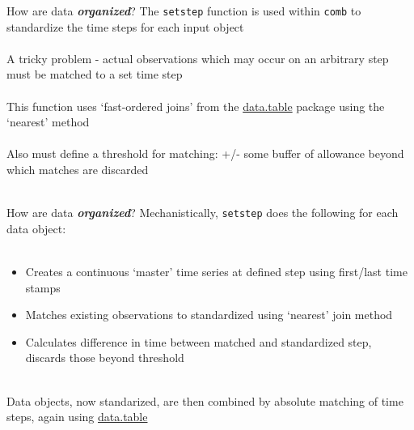 \documentclass[serif]{beamer}\usepackage[]{graphicx}\usepackage[]{color}
\newcommand{\Bigtxt}[1]{\textbf{\textit{#1}}}
\begin{document}
\begin{frame}{How are data \Bigtxt{organized}?}
The \texttt{setstep} function is used within \texttt{comb} to standardize the time steps for each input object \\~\\
A tricky problem - actual observations which may occur on an arbitrary step must be matched to a set time step\\~\\
This function uses `fast-ordered joins' from the \href{http://cran.r-project.org/web/packages/data.table/index.html}{data.table} package using the `nearest' method\\~\\
Also must define a threshold for matching: +/- some buffer of allowance beyond which matches are discarded \\~\\
\end{frame}

\begin{frame}{How are data \Bigtxt{organized}?}
Mechanistically, \texttt{setstep} does the following for each data object: \\~\\
\begin{itemize}
\item Creates a continuous `master' time series at defined step using first/last time stamps
\item Matches existing observations to standardized using `nearest' join method
\item Calculates difference in time between matched and standardized step, discards those beyond threshold \\~\\
\end{itemize}
Data objects, now standarized, are then combined by absolute matching of time steps, again using \href{http://cran.r-project.org/web/packages/data.table/index.html}{data.table}
\end{frame}
\end{document}
